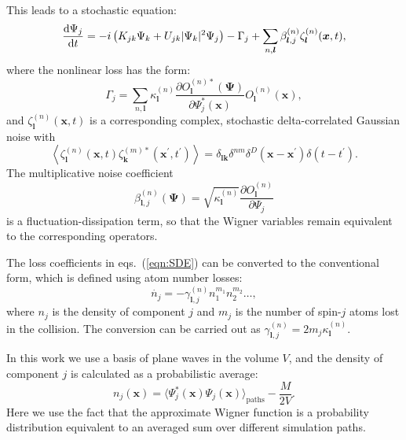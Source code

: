 \documentclass[doublecol]{epl2}
\newcommand{\xvec}{\boldsymbol{x}}
\newcommand{\kvec}{\boldsymbol{k}}
\newcommand{\lvec}{\boldsymbol{l}}
\newcommand{\Psivec}{\boldsymbol{\Psi}}
\begin{document}
This leads to a stochastic equation:
\begin{equation}
\label{eqn:SDE}
	\frac{\upd\Psi_j}{\upd t} =
		- i\left( K_{jk} \Psi_k + U_{jk} \lvert \Psi_k \rvert^{2} \Psi_j \right)
		- \Gamma_j
		+ \sum_{n,\lvec} \beta_{\lvec,j}^{(n)} \zeta_{\lvec}^{(n)}(\xvec,t),
\end{equation}
where the nonlinear loss has the form:
\begin{equation}
	\Gamma_j = \sum_{n,\lvec}
		\kappa_{\lvec}^{(n)}
		\frac{\partial O_{\lvec}^{(n)*} (\Psivec)}{\partial\Psi_j^{*} (\xvec)}
		O_{\lvec}^{(n)}(\xvec),
\end{equation}
and $\zeta_{\lvec}^{(n)}(\xvec, t)$ is a corresponding complex,
stochastic delta-correlated Gaussian noise with
\begin{equation}
	\left\langle
		\zeta_{\lvec}^{(n)} (\xvec,t) \zeta_{\kvec}^{(m)*}(\xvec^\prime, t^\prime)
	\right\rangle =
	\delta_{\lvec \kvec} \delta^{nm} \delta^{D} \left(
		\xvec - \xvec^\prime
	\right)
	\delta \left( t - t^\prime \right).
\end{equation}
The multiplicative noise coefficient
\begin{equation}
	\beta_{\lvec,j}^{(n)} \left( \Psivec \right) =
	\sqrt{\kappa_{\lvec}^{(n)}}
	\frac{\partial O_{\lvec}^{(n)}}{\partial\Psi_j}
\end{equation}
is a fluctuation-dissipation term,
so that the Wigner variables remain equivalent to the corresponding operators.

The loss coefficients in eqs.~(\ref{eqn:SDE}) can be converted to the conventional form,
which is defined using atom number losses:
\begin{equation}
	\dot{n_j} = - \gamma^{(n)}_{\lvec,j} n^{m_1}_1 n^{m_2}_2 \ldots ,
\end{equation}
where $n_j$ is the density of component $j$ and $m_j$
is the number of spin-$j$ atoms lost in the collision.
The conversion can be carried out as $\gamma^{(n)}_{\lvec,j} = 2 m_j \kappa^{(n)}_{\lvec}$.

In this work we use a basis of plane waves in the volume $V$,
and the density of component $j$ is calculated as a probabilistic average:
\begin{equation}
\label{eqn:wigner-density}
	n_j (\xvec)
		= \langle \Psi^*_j (\xvec) \Psi_j (\xvec) \rangle_{\mathrm{paths}} - \frac{M}{2V}.
\end{equation}
Here we use the fact that the approximate Wigner function is a probability distribution
equivalent to an averaged sum over different simulation paths.
\end{document}
